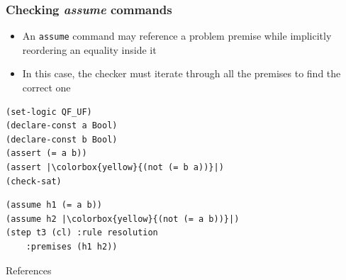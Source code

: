 \documentclass[usepdftitle=false,aspectratio=169]{beamer}
\newcommand\vitem{\vfill\item}
\begin{document}
\begin{frame}[fragile]
  \frametitle{Checking \textit{assume} commands}
  \begin{minipage}{0.54 \textwidth}
    \begin{itemize}
      \vitem An \texttt{assume} command may reference a problem premise while
      implicitly reordering an equality inside it
      \vspace{4ex}
      \vitem In this case, the checker must iterate through all the premises to
      find the correct one
    \end{itemize}
  \end{minipage}
  \begin{minipage}{0.45 \textwidth}
    \begin{verbatim}
(set-logic QF_UF)
(declare-const a Bool)
(declare-const b Bool)
(assert (= a b))
(assert |\colorbox{yellow}{(not (= b a))}|)
(check-sat)
    \end{verbatim}
    \begin{verbatim}
(assume h1 (= a b))
(assume h2 |\colorbox{yellow}{(not (= a b))}|)
(step t3 (cl) :rule resolution
    :premises (h1 h2))
    \end{verbatim}
  \end{minipage}
\end{frame}

\begin{frame}{References}
\printbibliography
\end{frame}
\end{document}
